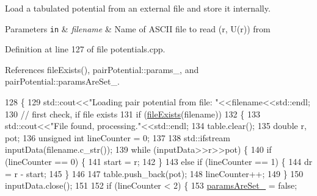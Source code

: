 Load a tabulated potential from an external file and store it internally. 


\begin{DoxyParams}[1]{Parameters}
\mbox{\tt in}  & {\em filename} & Name of A\+S\+C\+I\+I file to read (r, U(r)) from \\
\hline
\end{DoxyParams}


Definition at line 127 of file potentials.\+cpp.



References file\+Exists(), pair\+Potential\+::params\+\_\+, and pair\+Potential\+::params\+Are\+Set\+\_\+.


\begin{DoxyCode}
128 \{
129                 std::cout<<\textcolor{stringliteral}{"Loading pair potential from file: "}<<filename<<std::endl;
130                 \textcolor{comment}{// first check, if file exists}
131                 \textcolor{keywordflow}{if} (\hyperlink{utilities_8cpp_a9d1e3672fd331d4185c1763c80226307}{fileExists}(filename))
132                 \{
133                                 std::cout<<\textcolor{stringliteral}{"File found, processing."}<<std::endl;
134                                 table.clear();
135                                 \textcolor{keywordtype}{double} r, pot;
136                                 \textcolor{keywordtype}{unsigned} \textcolor{keywordtype}{int} lineCounter = 0;
137                                 
138                                 std::ifstream inputData(filename.c\_str());
139                                 \textcolor{keywordflow}{while} (inputData>>r>>pot) \{
140                                                 \textcolor{keywordflow}{if} (lineCounter == 0) \{
141                                                                 start = r;
142                                                 \}
143                                                 \textcolor{keywordflow}{else} \textcolor{keywordflow}{if} (lineCounter == 1) \{
144                                                                 dr = r - start;
145                                                 \}
146                                                 
147                                                 table.push\_back(pot);
148                                                 lineCounter++;
149                                 \}
150                                 inputData.close();
151                                 
152                                 \textcolor{keywordflow}{if} (lineCounter < 2) \{
153                                                 \hyperlink{classpair_potential_a635755c0a952bfc05a4cfae230c3dbd2}{paramsAreSet\_} = \textcolor{keyword}{false};

\end{DoxyCode}
